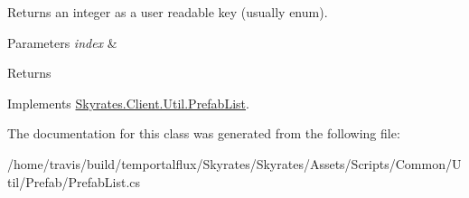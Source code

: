 Returns an integer as a user readable key (usually enum). 


\begin{DoxyParams}{Parameters}
{\em index} & \\
\hline
\end{DoxyParams}
\begin{DoxyReturn}{Returns}

\end{DoxyReturn}


Implements \hyperlink{class_skyrates_1_1_client_1_1_util_1_1_prefab_list_a462cb1bdd78ba22bd277874dc6b9239e}{Skyrates.\-Client.\-Util.\-Prefab\-List}.



The documentation for this class was generated from the following file\-:\begin{DoxyCompactItemize}
\item 
/home/travis/build/temportalflux/\-Skyrates/\-Skyrates/\-Assets/\-Scripts/\-Common/\-Util/\-Prefab/Prefab\-List.\-cs\end{DoxyCompactItemize}
